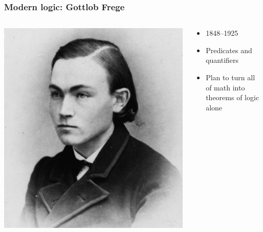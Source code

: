 \begin{frame}
  \frametitle{Modern logic: Gottlob Frege}

  \begin{columns}
    \begin{column}{.5\textwidth}
      \includegraphics[width=\textwidth]{../assets/frege}
    \end{column}
    \begin{column}{.5\textwidth}
      \begin{itemize}
        \item 1848--1925
        \item Predicates and quantifiers
        \item Plan to turn all of math into theorems of logic alone
      \end{itemize}
    \end{column}
  \end{columns}
\end{frame}

